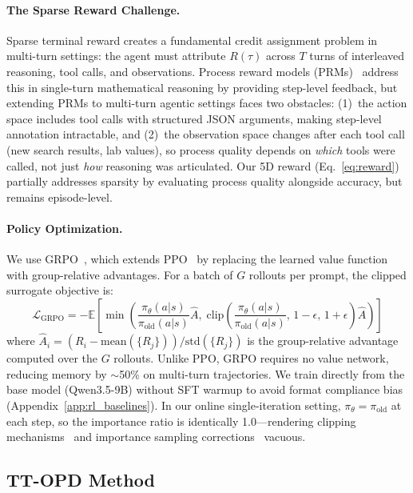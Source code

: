 \documentclass{article}
\begin{document}
\paragraph{The Sparse Reward Challenge.}
Sparse terminal reward creates a fundamental credit assignment problem in multi-turn settings: the agent must attribute $R(\tau)$ across $T$ turns of interleaved reasoning, tool calls, and observations. Process reward models (PRMs)~\citep{lightman2024lets, uesato2022solving} address this in single-turn mathematical reasoning by providing step-level feedback, but extending PRMs to multi-turn agentic settings faces two obstacles: (1)~the action space includes tool calls with structured JSON arguments, making step-level annotation intractable, and (2)~the observation space changes after each tool call (new search results, lab values), so process quality depends on \emph{which} tools were called, not just \emph{how} reasoning was articulated. Our 5D reward (Eq.~\ref{eq:reward}) partially addresses sparsity by evaluating process quality alongside accuracy, but remains episode-level.

\paragraph{Policy Optimization.}
We use GRPO~\citep{shao2024deepseekmath}, which extends PPO~\citep{schulman2017ppo} by replacing the learned value function with group-relative advantages. For a batch of $G$ rollouts per prompt, the clipped surrogate objective is:
\begin{equation}
    \mathcal{L}_{\text{GRPO}} = -\mathbb{E}\left[\min\!\left(\frac{\pi_\theta(a|s)}{\pi_{\text{old}}(a|s)}\hat{A},\; \text{clip}\!\left(\frac{\pi_\theta(a|s)}{\pi_{\text{old}}(a|s)},\, 1{-}\epsilon,\, 1{+}\epsilon\right)\hat{A}\right)\right]
\label{eq:grpo}
\end{equation}
where $\hat{A}_i = (R_i - \text{mean}(\{R_j\}))/\text{std}(\{R_j\})$ is the group-relative advantage computed over the $G$ rollouts. Unlike PPO, GRPO requires no value network, reducing memory by $\sim$50\% on multi-turn trajectories. We train directly from the base model (Qwen3.5-9B) without SFT warmup to avoid format compliance bias (Appendix~\ref{app:rl_baselines}). In our online single-iteration setting, $\pi_\theta = \pi_\text{old}$ at each step, so the importance ratio is identically 1.0---rendering clipping mechanisms~\citep{dapo2025} and importance sampling corrections~\citep{gspo2025} vacuous.

\subsection{TT-OPD Method}
\label{sec:opd}
\end{document}
